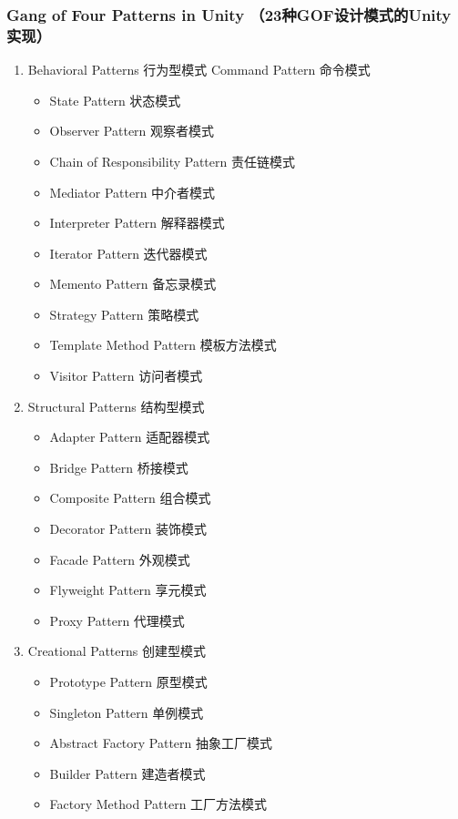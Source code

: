 \documentclass[9pt, b5paper]{article}
\begin{document}
\subsubsection{Gang of Four Patterns in Unity （23种GOF设计模式的Unity实现）}
\label{sec:orgda8c6b0}
\begin{enumerate}
\item Behavioral Patterns 行为型模式
\label{sec:org6dfb622}
Command Pattern 命令模式
\begin{itemize}
\item State Pattern 状态模式
\item Observer Pattern 观察者模式
\item Chain of Responsibility Pattern 责任链模式
\item Mediator Pattern 中介者模式
\item Interpreter Pattern 解释器模式
\item Iterator Pattern 迭代器模式
\item Memento Pattern 备忘录模式
\item Strategy Pattern 策略模式
\item Template Method Pattern 模板方法模式
\item Visitor Pattern 访问者模式
\end{itemize}
\item Structural Patterns 结构型模式
\label{sec:org272d0fa}
\begin{itemize}
\item Adapter Pattern 适配器模式
\item Bridge Pattern 桥接模式
\item Composite Pattern 组合模式
\item Decorator Pattern 装饰模式
\item Facade Pattern 外观模式
\item Flyweight Pattern 享元模式
\item Proxy Pattern 代理模式
\end{itemize}
\item Creational Patterns 创建型模式
\label{sec:orgd84bc07}
\begin{itemize}
\item Prototype Pattern 原型模式
\item Singleton Pattern 单例模式
\item Abstract Factory Pattern 抽象工厂模式
\item Builder Pattern 建造者模式
\item Factory Method Pattern 工厂方法模式
\end{itemize}
\end{enumerate}
\end{document}
